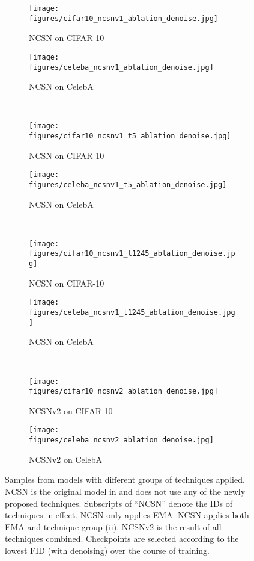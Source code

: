 \documentclass{article}
\begin{document}
\begin{figure}[H]
    \centering
    \begin{subfigure}{0.49\textwidth}
        \texttt{[image: figures/cifar10\_ncsnv1\_ablation\_denoise.jpg]}
        \caption{NCSN on CIFAR-10}
    \end{subfigure}
    \begin{subfigure}{0.49\textwidth}
        \texttt{[image: figures/celeba\_ncsnv1\_ablation\_denoise.jpg]}
        \caption{NCSN on CelebA}
    \end{subfigure}\\
    \begin{subfigure}{0.49\textwidth}
        \texttt{[image: figures/cifar10\_ncsnv1\_t5\_ablation\_denoise.jpg]}
        \caption{NCSN on CIFAR-10}
    \end{subfigure}
    \begin{subfigure}{0.49\textwidth}
        \texttt{[image: figures/celeba\_ncsnv1\_t5\_ablation\_denoise.jpg]}
        \caption{NCSN on CelebA}
    \end{subfigure}\\
    \begin{subfigure}{0.49\textwidth}
        \texttt{[image: figures/cifar10\_ncsnv1\_t1245\_ablation\_denoise.jpg]}
        \caption{NCSN on CIFAR-10}
    \end{subfigure}
    \begin{subfigure}{0.49\textwidth}
        \texttt{[image: figures/celeba\_ncsnv1\_t1245\_ablation\_denoise.jpg]}
        \caption{NCSN on CelebA}
    \end{subfigure}\\
    \begin{subfigure}{0.49\textwidth}
        \texttt{[image: figures/cifar10\_ncsnv2\_ablation\_denoise.jpg]}
        \caption{NCSNv2 on CIFAR-10}
    \end{subfigure}
    \begin{subfigure}{0.49\textwidth}
        \texttt{[image: figures/celeba\_ncsnv2\_ablation\_denoise.jpg]}
        \caption{NCSNv2 on CelebA}
    \end{subfigure}
    \caption{Samples from models with different groups of techniques applied. NCSN is the original model in \cite{song2019generative} and does not use any of the newly proposed techniques. Subscripts of ``NCSN'' denote the IDs of techniques in effect. NCSN only applies EMA. NCSN applies both EMA and technique group (ii). NCSNv2 is the result of all techniques combined. Checkpoints are selected according to the lowest FID (with denoising) over the course of training.}
    \label{fig:ablation_samples}
\end{figure}
\end{document}
